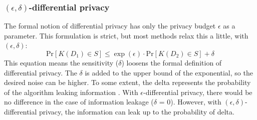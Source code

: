 \subsubsection{$(\epsilon, \delta)$-differential privacy}
The formal notion of differential privacy has only the privacy budget $\epsilon$ as a parameter.
This formulation is strict, but most methods relax this a little, with $(\epsilon, \delta)$:
\begin{equation}
  {\mathrm{Pr}}[K(D_{1})\in S]\leq\exp(\epsilon) \cdot {\mathrm{Pr}}[K(D_{2})\in S] + \delta
  \label{approxiate-dp}
\end{equation}
This equation means the sensitivity ($\delta$) loosens the formal definition of differential privacy.
The $\delta$ is added to the upper bound of the exponential, so the desired noise can be higher.
To some extent, the delta represents the probability of the algorithm leaking information \citep{aitsam_differential_2021}.
With $\epsilon$-differential privacy, there would be no difference in the case of information leakage ($\delta$ = 0).
However, with $(\epsilon, \delta)$-differential privacy, the information can leak up to the probability of delta.
\newpage
